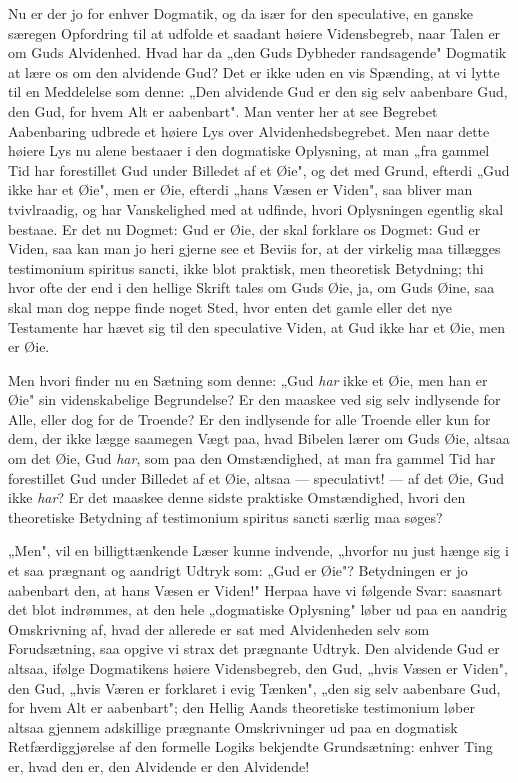 \documentclass[12pt]{book}
\newcommand{\opage}[1]{\marginnote{\footnotesize\textit{[#1]}}}
\begin{document}
Nu er der jo for enhver Dogmatik, og da især for den speculative, en ganske
særegen Opfordring til at udfolde et saadant høiere Vidensbegreb, naar Talen er om
Guds Alvidenhed. Hvad har da „den Guds Dybheder randsagende" Dogmatik at lære os
om den alvidende Gud? Det er ikke uden en vis Spænding, at vi lytte til en
Meddelelse som denne: „Den alvidende Gud er den sig selv aabenbare Gud, den Gud,
for hvem Alt er aabenbart". Man venter her at see Begrebet Aabenbaring udbrede et
høiere Lys over Alvidenhedsbegrebet. Men naar dette høiere Lys nu alene bestaaer i
den dogmatiske Oplysning, at man „fra gammel Tid har forestillet Gud under
Billedet af et Øie", og det med Grund, efterdi „Gud ikke har et Øie", men er Øie,
efterdi „hans Væsen er Viden", saa bliver man tvivlraadig, og har Vanskelighed med
at udfinde, hvori Oplysningen egentlig skal bestaae. Er det nu Dogmet: Gud er Øie,
der skal
\opage{50} forklare os Dogmet: Gud er Viden, saa kan man jo heri gjerne see et Beviis for, at
der virkelig maa tillægges testimonium spiritus sancti, ikke blot praktisk, men
theoretisk Betydning; thi hvor ofte der end i den hellige Skrift tales om Guds
Øie, ja, om Guds Øine, saa skal man dog neppe finde noget Sted, hvor enten det
gamle eller det nye Testamente har hævet sig til den speculative Viden, at Gud
ikke har et Øie, men er Øie.

Men hvori finder nu en Sætning som denne: „Gud \emph{har} ikke et Øie, men han er
Øie" sin videnskabelige Begrundelse? Er den maaskee ved sig selv indlysende for
Alle, eller dog for de Troende? Er den indlysende for alle Troende eller kun for
dem, der ikke lægge saamegen Vægt paa, hvad Bibelen lærer om Guds Øie, altsaa om
det Øie, Gud \emph{har}, som paa den Omstændighed, at man fra gammel Tid har
forestillet Gud under Billedet af et Øie, altsaa --- speculativt! --- af det Øie,
Gud ikke \emph{har}? Er det maaskee denne sidste praktiske Omstændighed, hvori den
theoretiske Betydning af testimonium spiritus sancti særlig maa søges?

„Men", vil en billigttænkende Læser kunne indvende, „hvorfor nu just hænge sig i
et saa prægnant og aandrigt Udtryk som: „Gud er Øie"? Betydningen er jo aabenbart
den, at hans Væsen er Viden!" Herpaa have vi følgende Svar: saasnart det blot
indrømmes, at den hele „dogmatiske Oplysning" løber ud paa en aandrig Omskrivning
af, hvad der allerede er sat med Alvidenheden selv som Forudsætning, saa opgive vi
strax det prægnante Udtryk. Den alvidende Gud er altsaa, ifølge Dogmatikens høiere
Vidensbegreb, den Gud, „hvis Væsen er Viden", den Gud, „hvis Væren er forklaret i
evig Tænken", „den sig selv aabenbare Gud, for hvem Alt er aabenbart"; den Hellig
Aands theoretiske testimonium løber altsaa gjennem adskillige prægnante
Omskrivninger ud paa en dogmatisk Retfærdiggjørelse af den formelle
\opage{51} Logiks bekjendte Grundsætning: enhver Ting er, hvad den er, den Alvidende er den
Alvidende!
\end{document}

